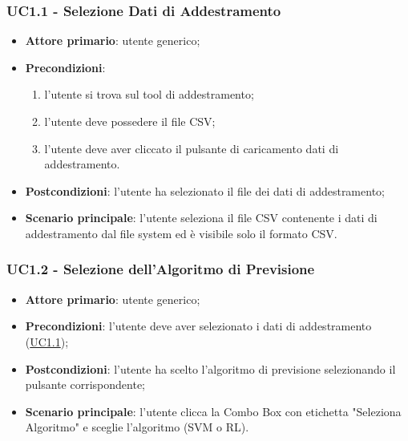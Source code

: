 		\subsubsection{UC1.1 - Selezione Dati di Addestramento }
		\begin{itemize}
			\item\textbf{Attore primario}: utente generico;
			\item\textbf{Precondizioni}:
				\begin{enumerate}
					\item l’utente si trova sul tool di addestramento;
					\item l’utente deve possedere il file CSV;
					\item l’utente deve aver cliccato il pulsante di caricamento dati di addestramento.
				\end{enumerate}
			\item\textbf{Postcondizioni}: l’utente ha selezionato il file dei dati di addestramento;
			\item\textbf{Scenario principale}: l’utente seleziona il file CSV contenente i dati di addestramento dal file system ed è visibile solo il formato CSV.
		\end{itemize}
		
		\label{par:UC1.2}
		\subsubsection{UC1.2 - Selezione dell’Algoritmo di Previsione}
		\begin{itemize}
			\item\textbf{Attore primario}: utente generico;
			\item\textbf{Precondizioni}: l’utente deve aver selezionato i dati di addestramento (\hyperref[par:UC1.1]{UC1.1});
			\item\textbf{Postcondizioni}: l’utente ha scelto l’algoritmo di previsione selezionando il pulsante corrispondente;
			\item\textbf{Scenario principale}: l’utente clicca la Combo Box con etichetta "Seleziona Algoritmo" e sceglie l’algoritmo (SVM o RL).
		\end{itemize}
	
	\label{par:UC1.3}
